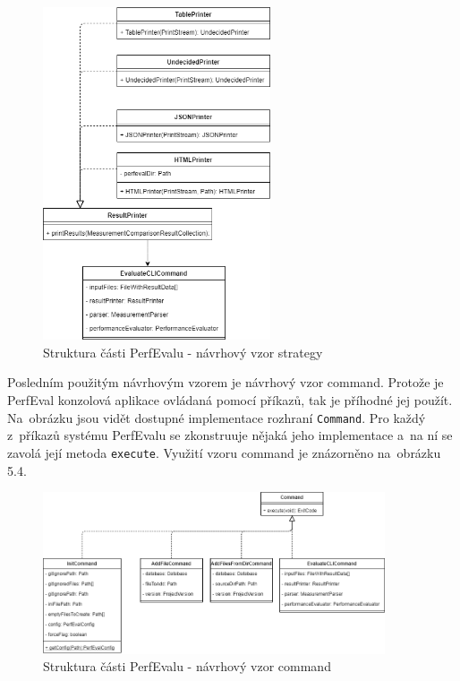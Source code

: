 \begin{figure}[!ht]
    \centering
    \includegraphics[width=0.6\textwidth]{../img/architektura-strategy.png}
    \caption{Struktura části PerfEvalu - návrhový vzor strategy}
\end{figure}

Posledním použitým návrhovým vzorem je návrhový vzor command. Protože je PerfEval
konzolová aplikace ovládaná pomocí příkazů, tak je příhodné jej použít. Na~obrázku
jsou vidět dostupné implementace rozhraní \lstinline{Command}. Pro každý z~příkazů
systému PerfEvalu se zkonstruuje nějaká jeho implementace a~na ní se zavolá její metoda
\lstinline{execute}. Využití vzoru command je znázorněno na~obrázku 5.4.

\begin{figure}[!ht]
    \centering
    \includegraphics[width=0.9\textwidth]{../img/architektura-command.png}
    \caption{Struktura části PerfEvalu - návrhový vzor command}
\end{figure}


